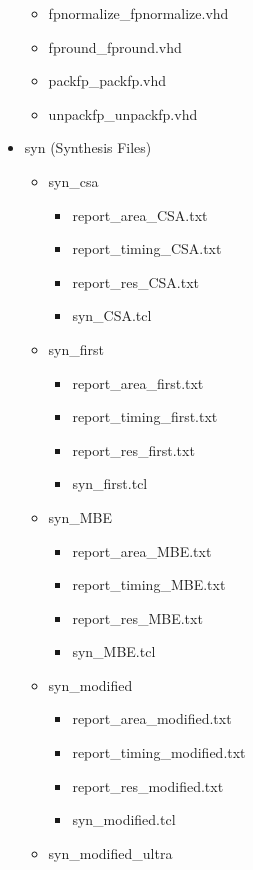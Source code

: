 \begin{itemize}
\begin{itemize}
            \item fpnormalize\_fpnormalize.vhd
            \item fpround\_fpround.vhd
            \item packfp\_packfp.vhd
            \item unpackfp\_unpackfp.vhd
        \end{itemize}
    \item syn (Synthesis Files)
    \begin{itemize}
        \item syn\_csa
         \begin{itemize}
            \item report\_area\_CSA.txt
            \item report\_timing\_CSA.txt
            \item report\_res\_CSA.txt
            \item syn\_CSA.tcl
        \end{itemize}
        \item syn\_first
         \begin{itemize}
            \item report\_area\_first.txt
            \item report\_timing\_first.txt
            \item report\_res\_first.txt
            \item syn\_first.tcl
        \end{itemize}
        \item syn\_MBE
         \begin{itemize}
            \item report\_area\_MBE.txt
            \item report\_timing\_MBE.txt
            \item report\_res\_MBE.txt
            \item syn\_MBE.tcl
        \end{itemize}
        \item syn\_modified
         \begin{itemize}
            \item report\_area\_modified.txt
            \item report\_timing\_modified.txt
            \item report\_res\_modified.txt
            \item syn\_modified.tcl
        \end{itemize}
        \item syn\_modified\_ultra

\end{itemize}
\end{itemize}
